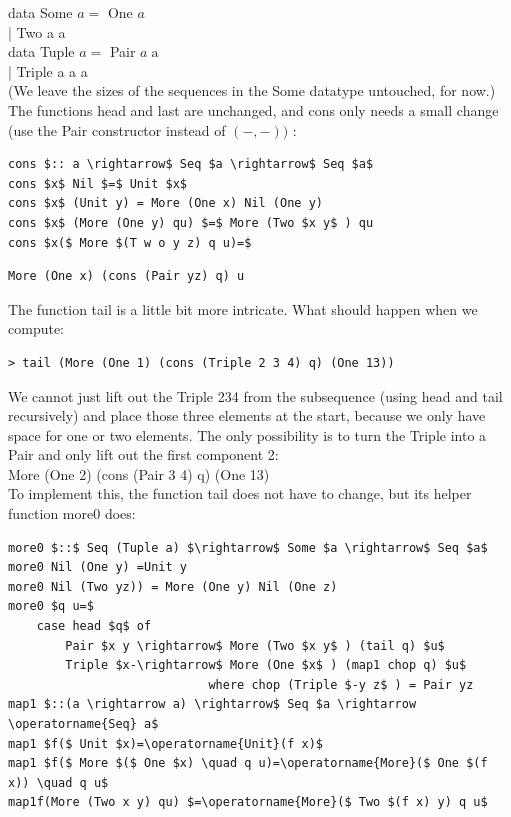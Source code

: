 \documentclass[10pt]{article}
\begin{document}
data Some $a=$ One $a$\\
| Two a a\\
data Tuple $a=$ Pair $a \operatorname{a}$\\
| Triple a a a\\
(We leave the sizes of the sequences in the Some datatype untouched, for now.) The functions head and last are unchanged, and cons only needs a small change (use the Pair constructor instead of $(-,-))$ :

\begin{verbatim}
cons $:: a \rightarrow$ Seq $a \rightarrow$ Seq $a$
cons $x$ Nil $=$ Unit $x$
cons $x$ (Unit y) = More (One x) Nil (One y)
cons $x$ (More (One y) qu) $=$ More (Two $x y$ ) qu
cons $x($ More $(T w o y z) q u)=$
\end{verbatim}

\begin{verbatim}
More (One x) (cons (Pair yz) q) u
\end{verbatim}

The function tail is a little bit more intricate. What should happen when we compute:

\begin{verbatim}
> tail (More (One 1) (cons (Triple 2 3 4) q) (One 13))
\end{verbatim}

We cannot just lift out the Triple 234 from the subsequence (using head and tail recursively) and place those three elements at the start, because we only have space for one or two elements. The only possibility is to turn the Triple into a Pair and only lift out the first component 2:\\
More (One 2) (cons (Pair 3 4) q) (One 13)\\
To implement this, the function tail does not have to change, but its helper function more0 does:

\begin{verbatim}
more0 $::$ Seq (Tuple a) $\rightarrow$ Some $a \rightarrow$ Seq $a$
more0 Nil (One y) =Unit y
more0 Nil (Two yz)) = More (One y) Nil (One z)
more0 $q u=$
    case head $q$ of
        Pair $x y \rightarrow$ More (Two $x y$ ) (tail q) $u$
        Triple $x-\rightarrow$ More (One $x$ ) (map1 chop q) $u$
                            where chop (Triple $-y z$ ) = Pair yz
map1 $::(a \rightarrow a) \rightarrow$ Seq $a \rightarrow \operatorname{Seq} a$
map1 $f($ Unit $x)=\operatorname{Unit}(f x)$
map1 $f($ More $($ One $x) \quad q u)=\operatorname{More}($ One $(f x)) \quad q u$
map1f(More (Two x y) qu) $=\operatorname{More}($ Two $(f x) y) q u$
\end{verbatim}
\end{document}
